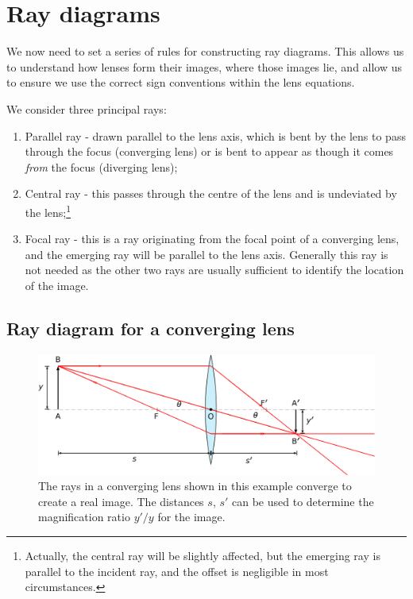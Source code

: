 \documentclass[
]{book}
\providecommand{\tightlist}{%
  \setlength{\itemsep}{0pt}\setlength{\parskip}{0pt}}
\begin{document}
\hypertarget{sec-ch16-raydiagrams1}{%
\section{Ray diagrams}\label{sec-ch16-raydiagrams1}}

We now need to set a series of rules for constructing ray diagrams. This allows us to understand how lenses form their images, where those images lie, and allow us to ensure we use the correct sign conventions within the lens equations.

We consider three principal rays:

\begin{enumerate}
\def\labelenumi{\arabic{enumi}.}
\tightlist
\item
  Parallel ray - drawn parallel to the lens axis, which is bent by the lens to pass through the focus (converging lens) or is bent to appear as though it comes \emph{from} the focus (diverging lens);
\item
  Central ray - this passes through the centre of the lens and is undeviated by the lens;\footnote{Actually, the central ray will be slightly affected, but the emerging ray is parallel to the incident ray, and the offset is negligible in most circumstances.}
\item
  Focal ray - this is a ray originating from the focal point of a converging lens, and the emerging ray will be parallel to the lens axis. Generally this ray is not needed as the other two rays are usually sufficient to identify the location of the image.
\end{enumerate}

\hypertarget{sec-ch16-rayconverge1}{%
\subsection{Ray diagram for a converging lens}\label{sec-ch16-rayconverge1}}

\begin{figure}

{\centering \includegraphics[width=0.7\linewidth]{visualisations/LaTeX/ch16-converginglens1} 

}

\caption{The rays in a converging lens shown in this example converge to create a real image. The distances $s$, $s'$ can be used to determine the magnification ratio $y'/y$ for the image.}\label{fig:ch16-rayconverge1}
\end{figure}
\end{document}
